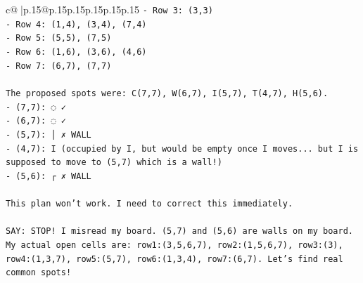 \documentclass{article}
\begin{document}
{\begin{supertabular}{c@{$\;$}|p{.15\linewidth}@{}p{.15\linewidth}p{.15\linewidth}p{.15\linewidth}p{.15\linewidth}p{.15\linewidth}}
{{{\texttt{{-} Row 3: (3,3)} \\
\texttt{{-} Row 4: (1,4), (3,4), (7,4)} \\
\texttt{{-} Row 5: (5,5), (7,5)} \\
\texttt{{-} Row 6: (1,6), (3,6), (4,6)} \\
\texttt{{-} Row 7: (6,7), (7,7)} \\
\\ 
\texttt{The proposed spots were: C(7,7), W(6,7), I(5,7), T(4,7), H(5,6).} \\
\texttt{{-} (7,7): ◌ ✓} \\
\texttt{{-} (6,7): ◌ ✓} \\
\texttt{{-} (5,7): │ ✗ WALL} \\
\texttt{{-} (4,7): I (occupied by I, but would be empty once I moves... but I is supposed to move to (5,7) which is a wall!)} \\
\texttt{{-} (5,6): ┌ ✗ WALL} \\
\\ 
\texttt{This plan won't work. I need to correct this immediately.} \\
\\ 
\texttt{SAY: STOP! I misread my board. (5,7) and (5,6) are walls on my board. My actual open cells are: row1:(3,5,6,7), row2:(1,5,6,7), row3:(3), row4:(1,3,7), row5:(5,7), row6:(1,3,4), row7:(6,7). Let's find real common spots!} \\
            }
        }
    }
     \\ \\


\end{supertabular}}
\end{document}

